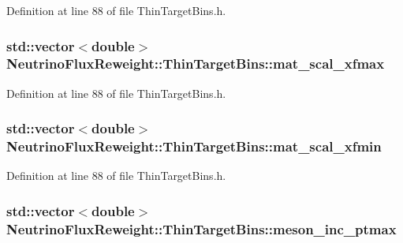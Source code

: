 Definition at line 88 of file Thin\-Target\-Bins.\-h.

\hypertarget{class_neutrino_flux_reweight_1_1_thin_target_bins_a24f7ec140608998c8dda3786db5626c3}{
\subsubsection[{mat\-\_\-scal\-\_\-xfmax}]{\setlength{\rightskip}{0pt plus 5cm}std\-::vector$<$double$>$ Neutrino\-Flux\-Reweight\-::\-Thin\-Target\-Bins\-::mat\-\_\-scal\-\_\-xfmax}}\label{class_neutrino_flux_reweight_1_1_thin_target_bins_a24f7ec140608998c8dda3786db5626c3}


Definition at line 88 of file Thin\-Target\-Bins.\-h.

\hypertarget{class_neutrino_flux_reweight_1_1_thin_target_bins_a982880bd093577f25bf0346363107c08}{
\subsubsection[{mat\-\_\-scal\-\_\-xfmin}]{\setlength{\rightskip}{0pt plus 5cm}std\-::vector$<$double$>$ Neutrino\-Flux\-Reweight\-::\-Thin\-Target\-Bins\-::mat\-\_\-scal\-\_\-xfmin}}\label{class_neutrino_flux_reweight_1_1_thin_target_bins_a982880bd093577f25bf0346363107c08}


Definition at line 88 of file Thin\-Target\-Bins.\-h.

\hypertarget{class_neutrino_flux_reweight_1_1_thin_target_bins_a16268b1a0d1587fb12a37a7e4c733ccc}{
\subsubsection[{meson\-\_\-inc\-\_\-ptmax}]{\setlength{\rightskip}{0pt plus 5cm}std\-::vector$<$double$>$ Neutrino\-Flux\-Reweight\-::\-Thin\-Target\-Bins\-::meson\-\_\-inc\-\_\-ptmax}}\label{class_neutrino_flux_reweight_1_1_thin_target_bins_a16268b1a0d1587fb12a37a7e4c733ccc}


